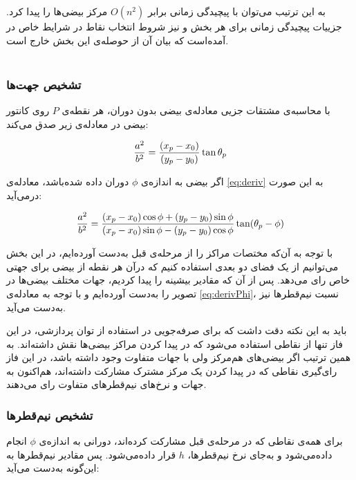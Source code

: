 \documentclass[12pt,a4paper]{article}
\numberwithin{equation}{section}
\numberwithin{figure}{section}
\theoremstyle{definition}
\theoremstyle{theorem}
\theoremstyle{definition}
\begin{document}
به این ترتیب می‌توان با پیچیدگی زمانی برابر 
\( O(n^2) \)
مرکز بیضی‌ها را پیدا کرد. جزییات پیچیدگی زمانی برای هر بخش و نیز شروط انتخاب نقاط در شرایط خاص در \cite{FEHT} آمده‌است که بیان آن از حوصله‌ی این بخش خارج است.
\\
\\
\subsubsection{تشخیص جهت‌ها}

با محاسبه‌ی مشتقات جزیی معادله‌ی بیضی بدون دوران، هر نقطه‌ی 
\( P \) 
روی کانتور بیضی در معادله‌ی زیر صدق می‌کند:

\begin{equation}
{ a^2 \over b^2} = { (x_p - x_0) \over (y_p - y_0)} \tan \theta_p 
\label{eq:deriv}
\end{equation}

اگر بیضی به اندازه‌ی 
\( \phi \)
دوران داده‌ شده‌باشد، معادله‌ی \ref{eq:deriv} به این صورت درمی‌آید: 

\begin{equation}
{ a^2 \over b^2} = { {(x_p - x_0) \cos \phi + (y_p - y_0 ) \sin \phi} \over {(x_p - x_0)\sin \phi - (y_p - y_0 ) \cos \phi}} \tan (\theta_p - \phi )
\label{eq:derivPhi}
\end{equation}

با توجه به آن‌که مختصات مراکز را از مرحله‌ی قبل به‌دست آورده‌ایم، در این بخش می‌توانیم از یک فضای دو بعدی استفاده کنیم که درآن هر نقطه از بیضی برای جهتی خاص رای می‌دهد. پس از آن که مقادیر بیشینه را پیدا کردیم، جهات مختلف بیضی‌ها در تصویر را به‌دست آورده‌ایم و با توجه به معادله‌ی \ref{eq:derivPhi}، نسبت نیم‌قطرها نیز به‌دست می‌آید. 

باید به این نکته دقت داشت که برای صرفه‌جویی در استفاده از توان پردازشی، در این فاز تنها از نقاطی استفاده می‌شود که در پیدا کردن مراکز بیضی‌ها نقش داشته‌اند. به همین ترتیب اگر بیضی‌های هم‌مرکز ولی با جهات متفاوت وجود داشته باشد، در این فاز رای‌گیری نقاطی که در پیدا کردن یک مرکز مشترک مشارکت داشته‌اند، هم‌اکنون به جهات و نرخ‌های نیم‌قطرهای متفاوت رای می‌دهند. 

\subsubsection{تشخیص نیم‌قطرها}

برای همه‌ی نقاطی که در مرحله‌ی قبل مشارکت کرده‌اند، دورانی به اندازه‌ی 
\( \phi \) 
انجام داده‌می‌شود و به‌جای نرخ نیم‌قطرها، 
\( h \) 
قرار داده‌می‌شود. پس مقادیر نیم‌قطرها به این‌گونه به‌دست می‌آید: 
\end{document}
